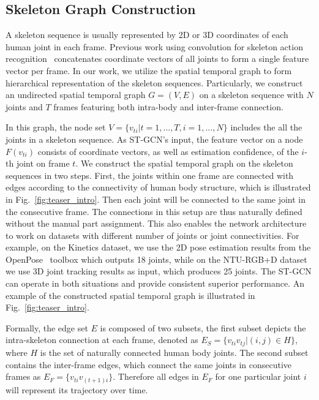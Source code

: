 \documentclass[letterpaper]{article} %
\begin{document}
\subsection{Skeleton Graph Construction}
\label{sec:graph_construction}
A skeleton sequence is usually represented by 2D or 3D coordinates of each human joint in each frame. Previous work using convolution for skeleton action recognition~\cite{Kim2017CVPRW} concatenates coordinate vectors of all joints to form a single feature vector per frame.
In our work, we utilize the spatial temporal graph to form hierarchical representation of the skeleton sequences.
Particularly, we construct an undirected spatial temporal graph $ G = (V, E) $ on a skeleton sequence with $ N $ joints and $ T $ frames featuring both intra-body and inter-frame connection.

In this graph, the node set $ V = \{v_{ti} | t = 1,\ldots, T, i=1,\ldots,N\} $ includes the all the joints in a skeleton sequence.
As ST-GCN's input, the feature vector on a node $F(v_{ti})$ consists of coordinate vectors, as well as estimation confidence, of the $i$-th joint on frame $t$.
We construct the spatial temporal graph on the skeleton sequences in two steps.
First, the joints within one frame are connected with edges according to the connectivity of human body structure, which is illustrated in Fig.~\ref{fig:teaser_intro}.
Then each joint will be connected to the same joint in the consecutive frame.
The connections in this setup are thus naturally defined without the manual part assignment.
This also enables the network architecture to work on datasets with different number of joints or joint connectivities.
For example, on the Kinetics dataset, we use the 2D pose estimation results from the OpenPose~\cite{Cao2017Openpose} toolbox which outputs 18 joints, while on the NTU-RGB+D dataset~\cite{Shahroudy2016CVPR} we use 3D joint tracking results as input, which produces 25 joints.
The ST-GCN can operate in both situations and provide consistent superior performance.
An example of the constructed spatial temporal graph is illustrated in Fig.~\ref{fig:teaser_intro}.

Formally,
the edge set $ E $ is composed of two subsets, the first subset depicts the intra-skeleton connection at each frame, denoted as
$
E_S = \{v_{ti}v_{tj}| (i, j) \in H\}
$,
where $ H $ is the set of naturally connected human body joints.
The second subset contains the inter-frame edges, which connect the same joints in consecutive frames as
$
	E_F = \{v_{ti}v_{(t+1) i}\}
$.
Therefore all edges in $ E_F $ for one particular joint $ i $ will represent its trajectory over time.
\end{document}
